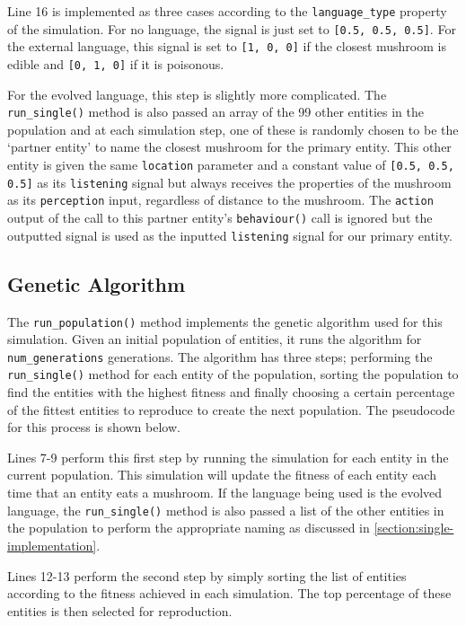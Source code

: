 \documentclass[12pt,a4paper]{report}
\begin{document}
Line 16 is implemented as three cases according to the \texttt{language\_type} property of the simulation. For no language, the signal is just set to \texttt{[0.5, 0.5, 0.5]}. For the external language, this signal is set to \texttt{[1, 0, 0]} if the closest mushroom is edible and \texttt{[0, 1, 0]} if it is poisonous.

For the evolved language, this step is slightly more complicated. The \texttt{run\_single()} method is also passed an array of the 99 other entities in the population and at each simulation step, one of these is randomly chosen to be the `partner entity' to name the closest mushroom for the primary entity. This other entity is given the same \texttt{location} parameter and a constant value of \texttt{[0.5, 0.5, 0.5]} as its \texttt{listening} signal but always receives the properties of the mushroom as its \texttt{perception} input, regardless of distance to the mushroom. The \texttt{action} output of the call to this partner entity's \texttt{behaviour()} call is ignored but the outputted signal is used as the inputted \texttt{listening} signal for our primary entity.

\subsection{Genetic Algorithm}

The \texttt{run\_population()} method implements the genetic algorithm used for this simulation. Given an initial population of entities, it runs the algorithm for \texttt{num\_generations} generations. The algorithm has three steps; performing the \texttt{run\_single()} method for each entity of the population, sorting the population to find the entities with the highest fitness and finally choosing a certain percentage of the fittest entities to reproduce to create the next population. The pseudocode for this process is shown below.

Lines 7-9 perform this first step by running the simulation for each entity in the current population. This simulation will update the fitness of each entity each time that an entity eats a mushroom. If the language being used is the evolved language, the \texttt{run\_single()} method is also passed a list of the other entities in the population to perform the appropriate naming as discussed in \cref{section:single-implementation}.

Lines 12-13 perform the second step by simply sorting the list of entities according to the fitness achieved in each simulation. The top percentage of these entities is then selected for reproduction.
\end{document}
